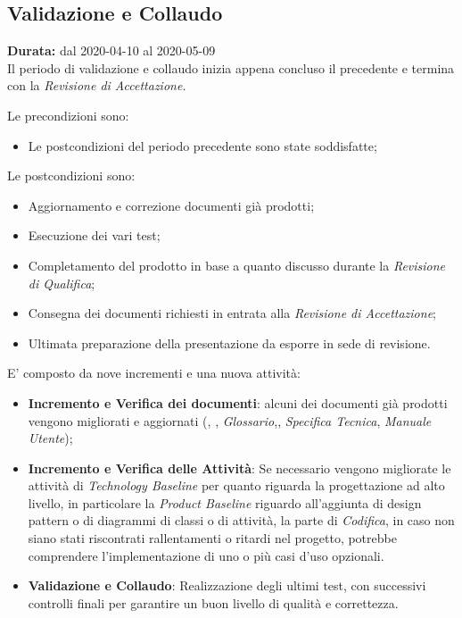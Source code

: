 \subsection{Validazione e Collaudo}
\label{validazione_e_collaudo}
\textbf{Durata:} dal 2020-04-10 al 2020-05-09 \\
Il periodo di validazione e collaudo inizia appena concluso il precedente e termina con la \textit{Revisione di Accettazione.}

Le precondizioni sono:
\begin{itemize}
    \item Le postcondizioni del periodo precedente sono state soddisfatte;
\end{itemize}

Le postcondizioni sono:
\begin{itemize}
    \item Aggiornamento e correzione documenti già prodotti;
    \item Esecuzione dei vari test;
    \item Completamento del prodotto in base a quanto discusso durante la \textit{Revisione di Qualifica};
    \item Consegna dei documenti richiesti in entrata alla \textit{Revisione di Accettazione};
    \item Ultimata preparazione della presentazione da esporre in sede di revisione.
\end{itemize}
E' composto da nove incrementi e una nuova attività:
\begin{itemize}
    \item \textbf{Incremento e Verifica dei documenti}: alcuni dei documenti già prodotti vengono migliorati e aggiornati (\textit{\NdP}, \textit{\PdP}, \textit{Glossario},\textit{\PdQ}, \textit{Specifica Tecnica}, \textit{Manuale Utente}); 
    \item \textbf{Incremento e Verifica delle Attività}: Se necessario vengono migliorate le attività di \textit{Technology Baseline} per quanto riguarda la progettazione ad alto livello, in particolare la \textit{Product Baseline} riguardo all'aggiunta di design pattern o di diagrammi di classi o di attività, la parte di \textit{Codifica}, in caso non siano stati riscontrati rallentamenti o ritardi nel progetto, potrebbe comprendere l'implementazione di uno o più casi d'uso opzionali.
    \item \textbf{Validazione e Collaudo}: Realizzazione degli ultimi test, con successivi controlli finali per garantire un buon livello di qualità e correttezza.
\end{itemize}

